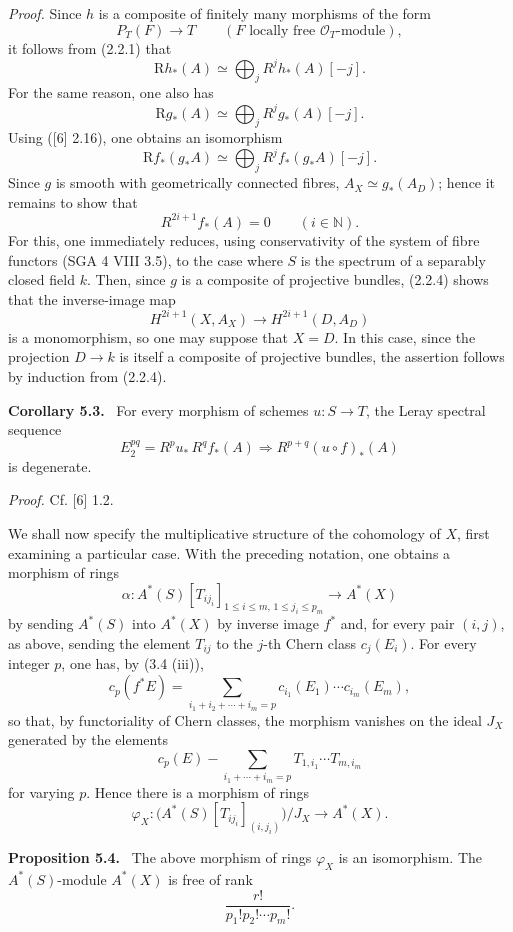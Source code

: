 \documentclass[11pt]{article}
\newenvironment{statement}[1]{\par\medskip\noindent\textbf{#1.}\ }{\par\medskip}
\begin{document}
\emph{Proof.} Since $h$ is a composite of finitely many morphisms of the form
\[
P_T(F)\to T\qquad (F\text{ locally free }\mathcal O_T\text{-module}),
\]
it follows from (2.2.1) that
\[
\mathrm Rh_*(A)\simeq\bigoplus_j R^jh_*(A)[-j].
\]
For the same reason, one also has
\[
\mathrm Rg_*(A)\simeq\bigoplus_j R^jg_*(A)[-j].
\]
Using ([6] 2.16), one obtains an isomorphism
\[
\mathrm Rf_*(g_*A)\simeq\bigoplus_j R^j f_*(g_*A)[-j].
\]
Since $g$ is smooth with geometrically connected fibres, $A_X\simeq g_*(A_D)$; hence it remains to show that
\[
R^{2i+1}f_*(A)=0\qquad (i\in\mathbb N).
\tag{5.2.1}
\]
For this, one immediately reduces, using conservativity of the system of fibre functors (SGA 4 VIII 3.5), to the case where $S$ is the spectrum of a separably closed field $k$. Then, since $g$ is a composite of projective bundles, (2.2.4) shows that the inverse-image map
\[
H^{2i+1}(X,A_X)\to H^{2i+1}(D,A_D)
\]
is a monomorphism, so one may suppose that $X=D$. In this case, since the projection $D\to k$ is itself a composite of projective bundles, the assertion follows by induction from (2.2.4).

\begin{statement}{Corollary 5.3}
For every morphism of schemes $u:S\to T$, the Leray spectral sequence
\[
E_2^{pq}=R^p u_*\,R^q f_*(A)\Rightarrow R^{p+q}(u\circ f)_*(A)
\]
is degenerate.
\end{statement}

\emph{Proof.} Cf. [6] 1.2.

We shall now specify the multiplicative structure of the cohomology of $X$, first examining a particular case. With the preceding notation, one obtains a morphism of rings
\[
\alpha:A^*(S)[T_{ij_i}]_{1\le i\le m,\,1\le j_i\le p_m}\to A^*(X)
\]
by sending $A^*(S)$ into $A^*(X)$ by inverse image $f^*$ and, for every pair $(i,j)$, as above, sending the element $T_{ij}$ to the $j$-th Chern class $c_j(E_i)$. For every integer $p$, one has, by (3.4 (iii)),
\[
c_p(f^*E)=\sum_{i_1+i_2+\cdots+i_m=p}c_{i_1}(E_1)\cdots c_{i_m}(E_m),
\]
so that, by functoriality of Chern classes, the morphism vanishes on the ideal $J_X$ generated by the elements
\[
c_p(E)-\sum_{i_1+\cdots+i_m=p}T_{1,i_1}\cdots T_{m,i_m}
\]
for varying $p$. Hence there is a morphism of rings
\[
\varphi_X:\bigl(A^*(S)[T_{ij_i}]_{(i,j_i)}\bigr)/J_X\to A^*(X).
\]

\begin{statement}{Proposition 5.4}
The above morphism of rings $\varphi_X$ is an isomorphism. The $A^*(S)$-module $A^*(X)$ is free of rank
\[
\frac{r!}{p_1!p_2!\cdots p_m!}.
\]
\end{statement}
\end{document}
